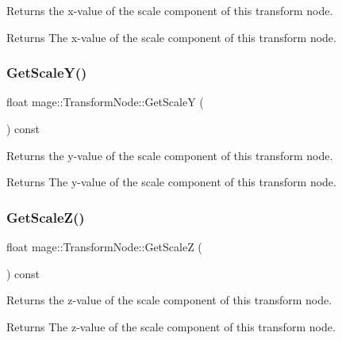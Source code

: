 Returns the x-\/value of the scale component of this transform node.

\begin{DoxyReturn}{Returns}
The x-\/value of the scale component of this transform node. 
\end{DoxyReturn}
\hypertarget{structmage_1_1_transform_node_a713993c5e55b27c31f63c7c88ed7dcea}{}\label{structmage_1_1_transform_node_a713993c5e55b27c31f63c7c88ed7dcea} 
\subsubsection{\texorpdfstring{Get\+Scale\+Y()}{GetScaleY()}}
{\footnotesize\ttfamily float mage\+::\+Transform\+Node\+::\+Get\+ScaleY (\begin{DoxyParamCaption}{ }\end{DoxyParamCaption}) const\hspace{0.3cm}{\ttfamily [noexcept]}}

Returns the y-\/value of the scale component of this transform node.

\begin{DoxyReturn}{Returns}
The y-\/value of the scale component of this transform node. 
\end{DoxyReturn}
\hypertarget{structmage_1_1_transform_node_afbdb531f22a57dcf89d23beeddba4268}{}\label{structmage_1_1_transform_node_afbdb531f22a57dcf89d23beeddba4268} 
\subsubsection{\texorpdfstring{Get\+Scale\+Z()}{GetScaleZ()}}
{\footnotesize\ttfamily float mage\+::\+Transform\+Node\+::\+Get\+ScaleZ (\begin{DoxyParamCaption}{ }\end{DoxyParamCaption}) const\hspace{0.3cm}{\ttfamily [noexcept]}}

Returns the z-\/value of the scale component of this transform node.

\begin{DoxyReturn}{Returns}
The z-\/value of the scale component of this transform node. 
\end{DoxyReturn}
\hypertarget{structmage_1_1_transform_node_a98da5fb59f03d37a615a9846e5f5e926}{}\label{structmage_1_1_transform_node_a98da5fb59f03d37a615a9846e5f5e926} 
